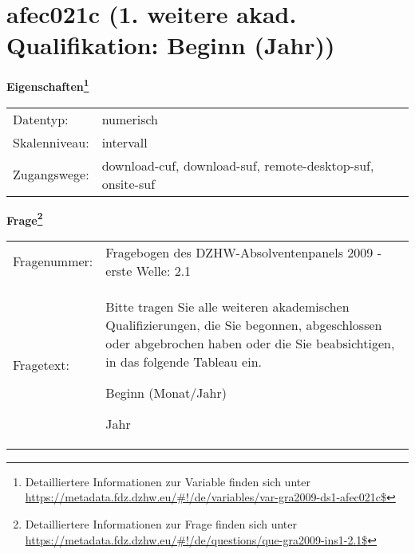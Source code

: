 
    \setcounter{footnote}{0}

    \vspace*{-1.8cm}
	\section{afec021c (1. weitere akad. Qualifikation: Beginn (Jahr))}
	\label{section:afec021c}



    \vspace*{0.5cm}
    \noindent\textbf{Eigenschaften\footnote{Detailliertere Informationen zur Variable finden sich unter
		\url{https://metadata.fdz.dzhw.eu/\#!/de/variables/var-gra2009-ds1-afec021c$}}}\\
	\begin{tabularx}{\hsize}{@{}lX}
	Datentyp: & numerisch \\
	Skalenniveau: & intervall \\
	Zugangswege: &
	  download-cuf, 
	  download-suf, 
	  remote-desktop-suf, 
	  onsite-suf
 \\
    \end{tabularx}



				\vspace*{0.5cm}
                \noindent\textbf{Frage\footnote{Detailliertere Informationen zur Frage finden sich unter
		              \url{https://metadata.fdz.dzhw.eu/\#!/de/questions/que-gra2009-ins1-2.1$}}}\\
				\begin{tabularx}{\hsize}{@{}lX}
					Fragenummer: &
					  Fragebogen des DZHW-Absolventenpanels 2009 - erste Welle:
					  2.1
 \\
					Fragetext: & Bitte tragen Sie alle weiteren akademischen Qualifizierungen, die Sie begonnen, abgeschlossen oder abgebrochen haben oder die Sie beabsichtigen, in das folgende Tableau ein.\par  Beginn (Monat/Jahr)\par  Jahr \\
				\end{tabularx}





